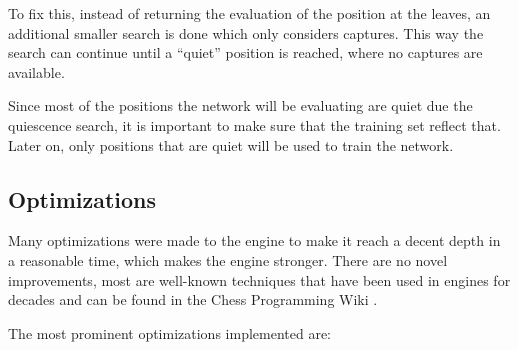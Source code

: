 To fix this, instead of returning the evaluation of the position at the leaves, an additional smaller search is done which only considers captures. This way the search can continue until a \enquote{quiet} position is reached, where no captures are available.

Since most of the positions the network will be evaluating are quiet due the quiescence search, it is important to make sure that the training set reflect that. Later on, only positions that are quiet will be used to train the network.

\subsection{Optimizations}

Many optimizations were made to the engine to make it reach a decent depth in a reasonable time, which makes the engine stronger. There are no novel improvements, most are well-known techniques that have been used in engines for decades and can be found in the Chess Programming Wiki \cite{cpw}.

The most prominent optimizations implemented are:

